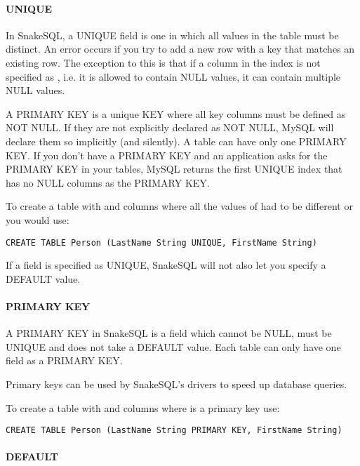 \documentclass{howto}
\begin{document}
\paragraph{UNIQUE}

In SnakeSQL, a UNIQUE field is one in which all values in the table must be distinct. An error occurs if you try to add a new row with a key that matches an existing row. The exception to this is that if a column in the index is not specified as , i.e. it is allowed to contain NULL values, it can contain multiple NULL values.

A PRIMARY KEY is a unique KEY where all key columns must be defined as NOT NULL. If they are not explicitly declared as NOT NULL, MySQL will declare them so implicitly (and silently). A table can have only one PRIMARY KEY. If you don't have a PRIMARY KEY and an application asks for the PRIMARY KEY in your tables, MySQL returns the first UNIQUE index that has no NULL columns as the PRIMARY KEY.

To create a table with  and  columns where all the values of  had to be different or  you would use:

\begin{verbatim}
CREATE TABLE Person (LastName String UNIQUE, FirstName String)
\end{verbatim}

If a field is specified as UNIQUE, SnakeSQL will not also let you specify a DEFAULT value.

\paragraph{PRIMARY KEY}

A PRIMARY KEY in SnakeSQL is a field which cannot be NULL, must be UNIQUE and does not take a DEFAULT value. Each table can only have one field as a PRIMARY KEY.

Primary keys can be used by SnakeSQL's drivers to speed up database queries. 

To create a table with  and  columns where  is a primary key use:

\begin{verbatim}
CREATE TABLE Person (LastName String PRIMARY KEY, FirstName String)
\end{verbatim}

\paragraph{DEFAULT}
\end{document}
